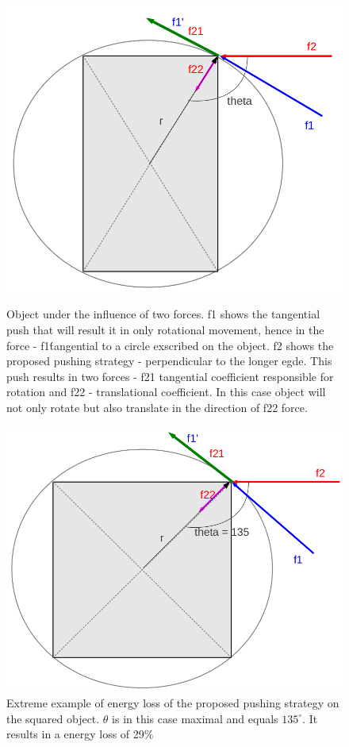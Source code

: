 \begin{figure}
\centering 

\includegraphics[width=0.5\columnwidth]{figures/rectangle-angle.png}\\


\caption{Object under the influence of two forces. f1 shows the tangential push that will result it in only rotational movement, hence in the force - f1\' tangential to a circle exscribed on the object. f2 shows the proposed pushing strategy - perpendicular to the longer egde. This push results in two forces - f21 tangential coefficient responsible for rotation and f22 - translational coefficient. In this case object will not only rotate but also translate in the direction of f22 force.  }
\label{fig:angles-rectangle}
\end{figure}


\begin{figure}
\centering
 

\includegraphics[width=0.5\columnwidth]{figures/square-angle.png}


\caption{Extreme example of energy loss of the proposed pushing strategy on the squared object. $\theta$ is in this case maximal and equals $135 ^\circ$. It results in a energy loss of 29\%  }
\label{fig:angles-square}
\end{figure}

